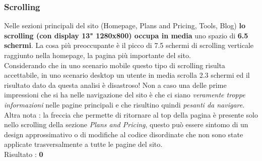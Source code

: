 \subsubsection{Scrolling}\label{scrolling}
Nelle sezioni principali del sito (Homepage, Plans and Pricing, Tools, Blog) 
\textbf{lo scrolling (con display 13" 1280x800) occupa in media} uno spazio di 
\textbf{6.5 schermi}. La cosa più preoccupante è il picco di 7.5 schermi di 
scrolling verticale raggiunto nella homepage, la pagina più importante del sito. \\Considerando che in uno scenario mobile questo tipo di scrolling
risulta accettabile, in uno scenario desktop un utente in media scrolla 2.3 schermi
ed il risultato dato da questa
analisi è disastroso! Non a caso una delle prime impressioni che si ha nelle 
navigazione del sito è che ci siano \textit{veramente troppe informazioni} 
nelle pagine principali e che risultino quindi \textit{pesanti da navigare}. \\
Altra nota : la freccia che permette di ritornare al top della 
pagina è presente solo nello scrolling della sezione \textit{Plans and Pricing},
questo può essere sintomo di un design approssimativo o di modifiche al codice
disordinate che non sono state applicate trasversalmente a tutte le pagine del 
sito. \\
Risultato : \textbf{0}